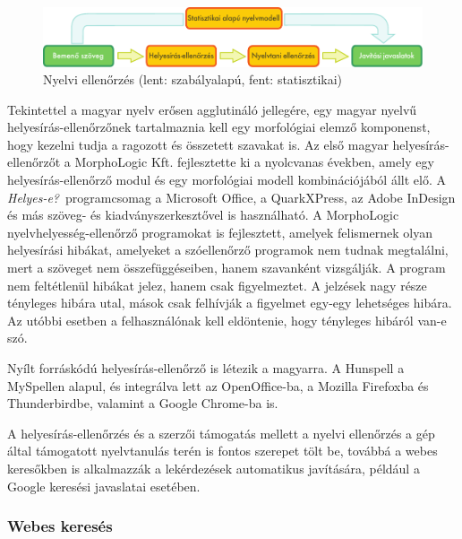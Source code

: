 \begin{multicols}{2}
\begin{figure}[htb]
  \center
  \includegraphics[width=\textwidth]{../_media/hungarian/language_checking}
  \caption{Nyelvi ellenőrzés (lent: szabályalapú, fent: statisztikai)}
  \label{fig:langcheckingaarch_de}
\end{figure}

Tekintettel a magyar nyelv erősen agg\-lu\-ti\-ná\-ló jellegére, egy magyar nyelvű helyesírás-ellenőrzőnek tartalmaznia kell egy morfológiai elemző komponenst, hogy kezelni tudja a ragozott és összetett sza\-va\-kat is. Az első magyar helyesírás-ellenőrzőt a MorphoLogic Kft. \cite{morpho} fej\-lesz\-tet\-te ki a nyolcvanas években, amely egy helyesírás-ellenőrző modul és egy morfológiai modell kombinációjából állt elő. A \textit{Helyes-e?}\ programcsomag a Microsoft Office, a QuarkXPress, az Adobe InDesign és más szöveg- és ki\-ad\-vány\-szer\-kesz\-tő\-vel is használható. A MorphoLogic nyelvhelyesség-ellenőrző programokat is fejlesztett, amelyek felismernek olyan he\-lyes\-írá\-si hibákat, amelyeket a szóellenőrző programok nem tudnak megtalálni, mert a szöveget nem összefüggéseiben, hanem szavanként vizsgálják. A program nem feltétlenül hibákat jelez, hanem csak figyelmeztet. A jelzések nagy része tény\-le\-ges hibára utal, mások csak felhívják a figyelmet egy-egy lehetséges hibára. Az utóbbi esetben a felhasználónak kell eldöntenie, hogy tényleges hibáról van-e szó.

Nyílt forráskódú helyesírás-ellenőrző is létezik a magyarra. A Hunspell \cite{hunspell} a MySpellen alapul, és integrálva lett az OpenOffice-ba, a Mozilla Firefoxba és Thunderbirdbe, valamint a Google Chrome-ba is.

A helyesírás-ellenőrzés és a szerzői támogatás mellett a nyelvi ellenőrzés a gép által támogatott nyelvtanulás terén is fontos szerepet tölt be, továbbá a webes keresőkben is alkalmazzák a lekérdezések automatikus javítására, például a Google keresési javaslatai esetében.

\subsubsection{Webes keresés}


\end{multicols}
